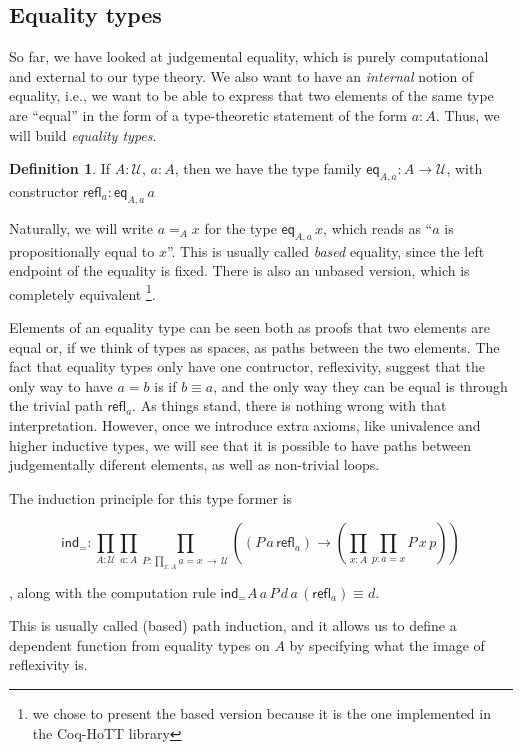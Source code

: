 \documentclass[12 pt]{amsart}
\theoremstyle{definition}
\newtheorem{definition}[subsubsection]{Definition}
\theoremstyle{remark}
\newcommand{\Type}{\mathcal{U}}
\newcommand{\refl}{\mathsf{refl}}
\newcommand{\ind}{\mathsf{ind}}
\begin{document}
\subsection{Equality types}
So far, we have looked at judgemental equality, which is purely computational and external to our type theory. We also want to have an \textit{internal} notion of equality, i.e., we want to be able to express that two elements of the same type are ``equal'' in the form of a type-theoretic statement of the form $a : A$. Thus, we will build \textit{equality types}.

\begin{definition}
    If $A : \Type$, $a : A$, then we have the type family $\mathsf{eq}_{A,a} : A\to \Type$, with constructor $\refl_a : \mathsf{eq}_{A,a} \,a$
\end{definition}

Naturally, we will write $a =_A x$ for the type $\mathsf{eq}_{A,a}\,x$, which reads as ``$a$ is propositionally equal to $x$''. This is usually called \textit{based} equality, since the left endpoint of the equality is fixed. There is also an unbased version, which is completely equivalent \cite[Section 1.12]{hottbook}\footnote{we chose to present the based version because it is the one implemented in the Coq-HoTT library}. 

Elements of an equality type can be seen both as proofs that two elements are equal or, if we think of types as spaces, as paths between the two elements. The fact that equality types only have one contructor, reflexivity, suggest that the only way to have $a = b$ is if $b \equiv a$, and the only way they can be equal is through the trivial path $\refl_a$. As things stand, there is nothing wrong with that interpretation. However, once we introduce extra axioms, like univalence and higher inductive types, we will see that it is possible to have paths between judgementally diferent elements, as well as non-trivial loops.

The induction principle for this type former is

\[\ind_{=} : \prod_{A : \Type} \prod_ {a : A} \prod_{P : \prod_{x : A} a = x\, \to \,\Type} \left( (P\, a\, \refl_a) \to \left(\prod_{x : A} \prod_{p : a = x} P \,x\,p \right)\right)\]

, along with the computation rule $\ind_{=} A \, a\, P\, d\, a\, (\refl_a) \equiv d $.

This is usually called (based) path induction, and it allows us to define a dependent function from equality types on $A$ by specifying what the image of reflexivity is.
\end{document}
